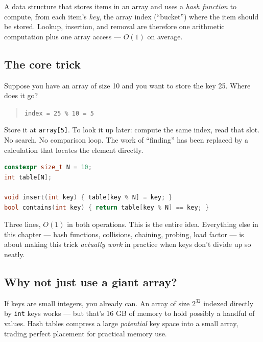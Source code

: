 \documentclass[11pt]{article}
\begin{document}
\begin{defnbox}
A data structure that stores items in an array and uses a
\emph{hash function} to compute, from each item's \emph{key}, the
array index (``bucket'') where the item should be stored. Lookup,
insertion, and removal are therefore one arithmetic computation
plus one array access --- $O(1)$ on average.
\end{defnbox}

\subsection*{The core trick}

Suppose you have an array of size 10 and you want to store the
key 25. Where does it go?

\begin{quote}
\texttt{index = 25 \% 10 = 5}
\end{quote}

Store it at \texttt{array[5]}. To look it up later: compute the
same index, read that slot. No search. No comparison loop. The
work of ``finding'' has been replaced by a calculation that
locates the element directly.

\begin{examplebox}
\begin{lstlisting}[language=C++,basicstyle=\ttfamily\small,frame=single]
constexpr size_t N = 10;
int table[N];

void insert(int key) { table[key % N] = key; }
bool contains(int key) { return table[key % N] == key; }
\end{lstlisting}
\end{examplebox}

Three lines, $O(1)$ in both operations. This is the entire idea.
Everything else in this chapter --- hash functions, collisions,
chaining, probing, load factor --- is about making this trick
\emph{actually work} in practice when keys don't divide up so
neatly.

\subsection*{Why not just use a giant array?}

If keys are small integers, you already can. An array of size
$2^{32}$ indexed directly by \texttt{int} keys works --- but
that's 16 GB of memory to hold possibly a handful of values.
Hash tables compress a large \emph{potential} key space into a
small array, trading perfect placement for practical memory use.
\end{document}

